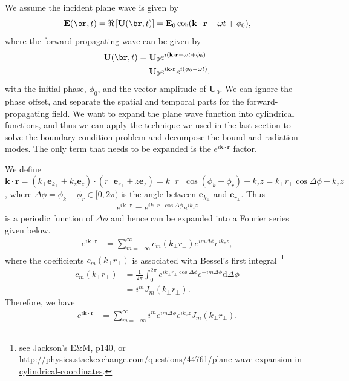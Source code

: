 \documentclass[]{report}
\begin{document}
We assume the incident plane wave is given by
\begin{equation}
\mathbf{E}(\br,t)=\Re\left[\mathbf{U}(\br,t) \right]=\mathbf{E}_0 \cos (\mathbf{k}\cdot\mathbf{r}-\omega t + \phi_0),
\end{equation}
where the forward propagating wave can be given by
\begin{align}
\mathbf{U}(\br,t) &= \mathbf{U}_0e^{i(\mathbf{k}\cdot\mathbf{r}-\omega t + \phi_0)}\\
&= \mathbf{U}_0e^{i\mathbf{k}\cdot\mathbf{r}}e^{i(\phi_0-\omega t )}.
\end{align}
with the initial phase, $\phi_0$, and the vector amplitude of $\mathbf{U}_0$. We can ignore the phase offset, and separate the spatial and temporal parts for the forward-propagating field. We want to expand the plane wave function into cylindrical functions, and thus we can apply the technique we used in the last section to solve the boundary condition problem and decompose the bound and radiation modes. The only term that needs to be expanded is the $ e^{i\mathbf{k}\cdot\mathbf{r}} $ factor. 

We define $ \mathbf{k}\cdot\mathbf{r}=(k\!_{\perp}\mathbf{e}\!_{k\!_\perp}+k_z\mathbf{e}_{z}) \cdot(r\!_{\perp}\mathbf{e}\!_{r\!_\perp}+z\mathbf{e}_{z}) = k\!_{\perp}r\!_{\perp}\cos(\phi_{k}-\phi_{r})+k_{z}{z}= k\!_\perp r\!_\perp \cos \Delta\phi +k_{z}{z}$, where $ \Delta\phi=\phi_{k}-\phi_{r} \in [0,2\pi)$ is the angle between $ \mathbf{e}_{k\!_\perp} $ and $ \mathbf{e}_{r\!_\perp} $. Thus
\begin{align}
e^{i\mathbf{k}\cdot \mathbf{r}}=e^{ik\!_\perp r\!_\perp\cos\Delta\phi}e^{ik_{z}{z}}
\end{align}
is a periodic function of $ \Delta\phi $ and hence can be expanded into a Fourier series given below. 
\begin{align}
e^{i\mathbf{k}\cdot \mathbf{r}} &= \sum_{m=-\infty}^{\infty}c_{m}(k\!_\perp r\!_\perp)e^{im\Delta\phi}e^{ik_{z}{z}},
\end{align}
where the coefficients $ c_{m}(k\!_\perp r\!_\perp) $ is associated with Bessel's first integral~\footnote{see Jackson's E\&M, p140, or \url{http://physics.stackexchange.com/questions/44761/plane-wave-expansion-in-cylindrical-coordinates}.}
\begin{align}
c_{m}(k\!_\perp r\!_\perp)&= \frac{1}{2\pi} \int_0^{2\pi} e^{ik\!_\perp r\!_\perp\cos \Delta\phi}e^{-im\Delta\phi}\mathrm{d}\Delta\phi\\
&=i^mJ_m(k\!_\perp r\!_\perp).
\end{align}
Therefore, we have
\begin{align}
e^{i\mathbf{k}\cdot \mathbf{r}} &=\sum_{m=-\infty}^{\infty}i^me^{im\Delta\phi}e^{ik_{z}{z}}J_m(k\!_\perp r\!_\perp).
\end{align}
\end{document}
